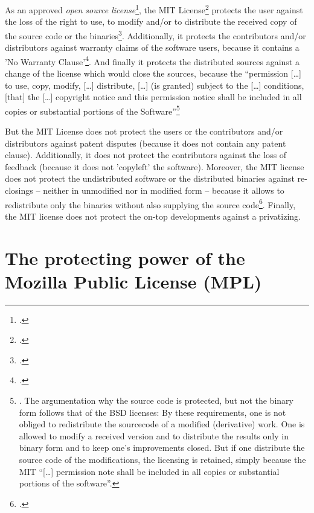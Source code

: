 As an approved \emph{open source license}\footcite[cf.][\nopage wp]{OSI2012b},
the MIT License\footcite[MIT has to be resolved as \enquote{Massachusetts
Institute of Technology} (cf.][\nopage wp)]{wpMitLic2011a} protects the user
against the loss of the right to use, to modify and/or to distribute the
received copy of the source code or the binaries\footcite[cf.][\nopage wp
1ff]{OSI2012a}. Additionally, it protects the contributors and/or distributors
against warranty claims of the software users, because it contains a 'No
Warranty Clause'\footcite[cf.][\nopage wp]{MitLicense2012a}. And finally it
protects the distributed sources against a change of the license which would
close the sources, because the \enquote{permission [\ldots] to use, copy,
modify, [\ldots] distribute, [\ldots] (is granted) subject to the [\ldots]
conditions, [that] the [\ldots] copyright notice and this permission notice
shall be included in all copies or substantial portions of the
Software}\footnote{\cite[cf.][\nopage wp]{MitLicense2012a}. The argumentation
why the source code is protected, but not the binary form follows that of the
BSD licenses: By these requirements, one is not obliged to redistribute the
sourcecode of a modified (derivative) work. One is allowed to modify a received
version and to distribute the results only in binary form and to keep one's
improvements closed. But if one distribute the source code of the modifications,
the licensing is retained, simply because the MIT \enquote{[\ldots] permission
note shall be included in all copies or substantial portions of the software}.}

But the MIT License does not protect the users or the contributors and/or
distributors against patent disputes (because it does not contain any patent
clause). Additionally, it does not protect the contributors against the loss of
feedback (because it does not 'copyleft' the software). Moreover, the MIT
license does not protect the undistributed software or the distributed binaries
against re-closings -- neither in unmodified nor in modified form -- because it
allows to redistribute only the binaries without also supplying the source
code\footcite[cf.][\nopage wp]{MitLicense2012a}. Finally, the MIT license does
not protect the on-top developments against a privatizing.

\section{The protecting power of the Mozilla Public License (MPL)}
 \label{sec:ProtectingPowerOfMpl}
 
